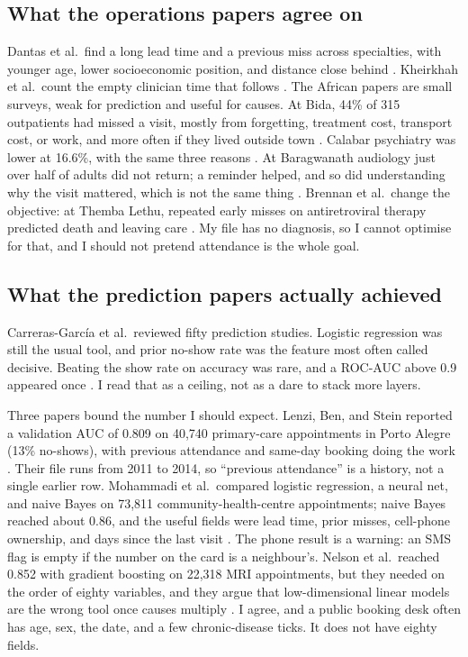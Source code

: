 \documentclass[conference]{IEEEtran}
\begin{document}
\subsection{What the operations papers agree on}
Dantas et al.\ find a long lead time and a previous miss across specialties, with younger age, lower socioeconomic position, and distance close behind \cite{dantas2018}. Kheirkhah et al.\ count the empty clinician time that follows \cite{kheirkhah2016}. The African papers are small surveys, weak for prediction and useful for causes. At Bida, 44\% of 315 outpatients had missed a visit, mostly from forgetting, treatment cost, transport cost, or work, and more often if they lived outside town \cite{omokanye2021}. Calabar psychiatry was lower at 16.6\%, with the same three reasons \cite{edet2024}. At Baragwanath audiology just over half of adults did not return; a reminder helped, and so did understanding why the visit mattered, which is not the same thing \cite{khan2023}. Brennan et al.\ change the objective: at Themba Lethu, repeated early misses on antiretroviral therapy predicted death and leaving care \cite{brennan2010}. My file has no diagnosis, so I cannot optimise for that, and I should not pretend attendance is the whole goal.

\subsection{What the prediction papers actually achieved}
Carreras-Garc\'{i}a et al.\ reviewed fifty prediction studies. Logistic regression was still the usual tool, and prior no-show rate was the feature most often called decisive. Beating the show rate on accuracy was rare, and a ROC-AUC above 0.9 appeared once \cite{carreras2020}. I read that as a ceiling, not as a dare to stack more layers.

Three papers bound the number I should expect. Lenzi, Ben, and Stein reported a validation AUC of 0.809 on 40,740 primary-care appointments in Porto Alegre (13\% no-shows), with previous attendance and same-day booking doing the work \cite{lenzi2019}. Their file runs from 2011 to 2014, so ``previous attendance'' is a history, not a single earlier row. Mohammadi et al.\ compared logistic regression, a neural net, and naive Bayes on 73,811 community-health-centre appointments; naive Bayes reached about 0.86, and the useful fields were lead time, prior misses, cell-phone ownership, and days since the last visit \cite{mohammadi2018}. The phone result is a warning: an SMS flag is empty if the number on the card is a neighbour's. Nelson et al.\ reached 0.852 with gradient boosting on 22,318 MRI appointments, but they needed on the order of eighty variables, and they argue that low-dimensional linear models are the wrong tool once causes multiply \cite{nelson2019}. I agree, and a public booking desk often has age, sex, the date, and a few chronic-disease ticks. It does not have eighty fields.
\end{document}
